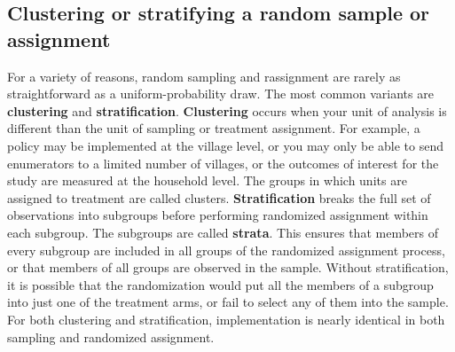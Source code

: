 
\subsection{Clustering or stratifying a random sample or assignment}

For a variety of reasons, random sampling and rassignment
are rarely as straightforward as a uniform-probability draw.
The most common variants are \textbf{clustering} and \textbf{stratification}.\cite{athey2017econometrics}
\textbf{Clustering} occurs when your unit of analysis is different
than the unit of sampling or treatment assignment.
For example, a policy may be implemented at the village level,
or you may only be able to send enumerators to a limited number of villages,
or the outcomes of interest for the study are measured at the household level.
The groups in which units are assigned to treatment are called clusters.
\textbf{Stratification} breaks the full set of observations into subgroups
before performing randomized assignment within each subgroup.
The subgroups are called \textbf{strata}.
This ensures that members of every subgroup
are included in all groups of the randomized assignment process,
or that members of all groups are observed in the sample.
Without stratification, it is possible that the randomization
would put all the members of a subgroup into just one of the treatment arms,
or fail to select any of them into the sample.
For both clustering and stratification,
implementation is nearly identical in both sampling and randomized assignment.

